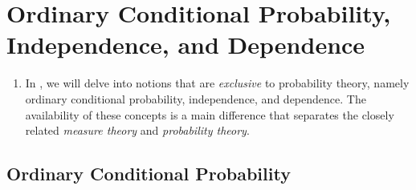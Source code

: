 \section{Ordinary Conditional Probability, Independence, and Dependence}
\label{sect:cond-prob-indep-dep}
\begin{enumerate}
\item In , we will delve into notions that are
\emph{exclusive} to probability theory, namely ordinary conditional probability,
independence, and dependence. The availability of these concepts is a main
difference that separates the closely related \emph{measure theory} and \emph{probability
theory}.
\end{enumerate}
\subsection{Ordinary Conditional Probability}
